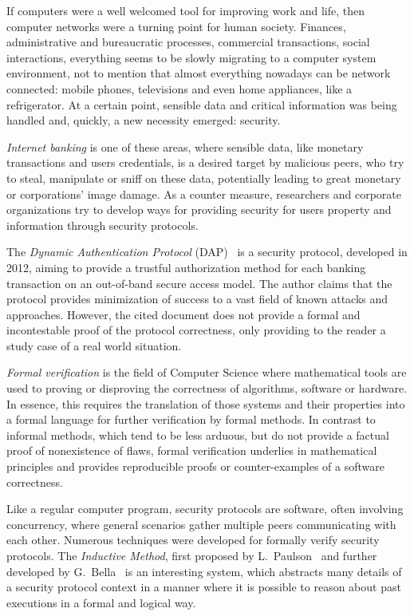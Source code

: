 If computers were a well welcomed tool for improving work and life, then computer networks were a turning point for human society. Finances, administrative and bureaucratic processes, commercial transactions, social interactions, everything seems to be slowly migrating to a computer system environment, not to mention that almost everything nowadays can be network connected: mobile phones, televisions and even home appliances, like a refrigerator. At a certain point, sensible data and critical information was being handled and, quickly, a new necessity emerged: security.

\textit{Internet banking} is one of these areas, where sensible data, like monetary transactions and users credentials, is a desired target by malicious peers, who try to steal, manipulate or sniff on these data, potentially leading to great monetary or corporations' image damage. As a counter measure, researchers and corporate organizations try to develop ways for providing security for users property and information through security protocols.

The \textit{Dynamic Authentication Protocol} (DAP)~\cite{Peotta2012} is a security protocol, developed in 2012, aiming to provide a trustful authorization method for each banking transaction on an out-of-band secure access model. The author claims that the protocol provides minimization of success to a vast field of known attacks and approaches. However, the cited document does not provide a formal and incontestable proof of the protocol correctness, only providing to the reader a study case of a real world situation.

\textit{Formal verification} is the field of Computer Science where mathematical tools are used to proving or disproving the correctness of algorithms, software or hardware. In essence, this requires the translation of those systems and their properties into a formal language for further verification by formal methods. In contrast to informal methods, which tend to be less arduous, but do not provide a factual proof of nonexistence of flaws, formal verification underlies in mathematical principles and provides reproducible proofs or counter-examples of a software correctness.

Like a regular computer program, security protocols are software, often involving concurrency, where general scenarios gather multiple peers communicating with each other. Numerous techniques were developed for formally verify security protocols. The \textit{Inductive Method}, first proposed by L.~Paulson~\cite{Paulson98} and further developed by G.~Bella~\cite{Bella2007} is an interesting system, which abstracts many details of a security protocol context in a manner where it is possible to reason about past executions in a formal and logical way.

